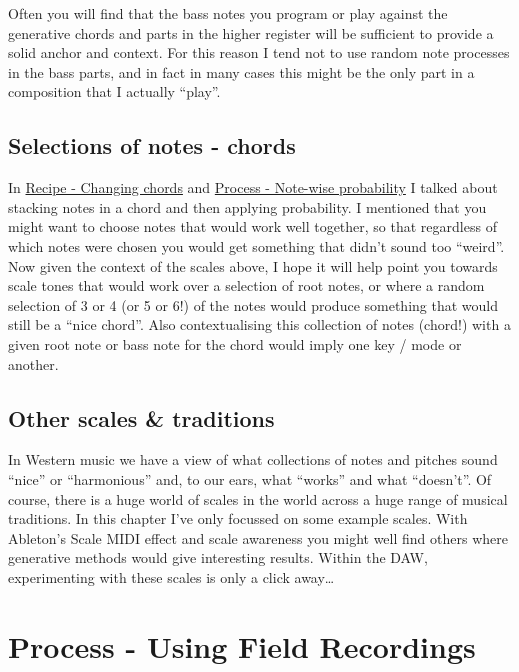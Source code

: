 \documentclass[
  12pt,
  letterpaper,
  oneside,
  open=any]{scrbook}
\begin{document}
Often you will find that the bass notes you program or play against the
generative chords and parts in the higher register will be sufficient to
provide a solid anchor and context. For this reason I tend not to use
random note processes in the bass parts, and in fact in many cases this
might be the only part in a composition that I actually ``play''.

\section{Selections of notes -
chords}\label{selections-of-notes---chords}

In \hyperref[Chapter-001-Recipe-Changing_Chords]{Recipe - Changing
chords} and \hyperref[Chapter-002-Process-Note_wise_probability]{Process
- Note-wise probability} I talked about stacking notes in a chord and
then applying probability. I mentioned that you might want to choose
notes that would work well together, so that regardless of which notes
were chosen you would get something that didn't sound too ``weird''. Now
given the context of the scales above, I hope it will help point you
towards scale tones that would work over a selection of root notes, or
where a random selection of 3 or 4 (or 5 or 6!) of the notes would
produce something that would still be a ``nice chord''. Also
contextualising this collection of notes (chord!) with a given root note
or bass note for the chord would imply one key / mode or another.

\section{Other scales \& traditions}\label{other-scales-traditions}

In Western music we have a view of what collections of notes and pitches
sound ``nice'' or ``harmonious'' and, to our ears, what ``works'' and
what ``doesn't''. Of course, there is a huge world of scales in the
world across a huge range of musical traditions. In this chapter I've
only focussed on some example scales. With Ableton's Scale MIDI effect
and scale awareness you might well find others where generative methods
would give interesting results. Within the DAW, experimenting with these
scales is only a click away\ldots{}


\chapter{Process - Using Field
Recordings}\label{Chapter-019-Process-Using_Field_Recordings}
\end{document}
